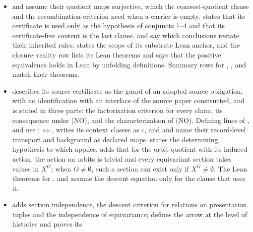 \begin{itemize}
  hypotheses of  are
  spelled out before them, the direct one through a declared reduct map, and a
  finite model with a closure operator follows each and satisfies its
  hypothesis. Both theorems state the finite model as their last clause, so
  neither implication follows from the axioms of a closure operator with
  reduct stability, and  adds that the converse
  fails exactly when some fixed point of the closure is not bare-realised.
\item {} and  assume their quotient maps surjective,
  which the coarsest-quotient clause and the recombination criterion need
  when a carrier is empty.  states that its certificate is
  used only as the hypothesis of conjuncts 1--4 and that its
  certificate-free content is the last clause.  and
   say which conclusions restate their inherited rules.
   states the scope of its substrate Lean anchor, and the
  closure--reality row lists its Lean theorems and says that the positive
  equivalence holds in Lean by unfolding definitions. Summary rows for
  , ,  and  match their theorems.
\item {} describes its source certificate as the guard of an
  adopted source obligation, with no identification with an interface of the
  source paper constructed, and  is stated
  in three parts: the factorization criterion for every claim, its
  consequence under (NO), and the characterization of (NO). Defining lines of
  ,  and  use
  \(:\Longleftrightarrow\),  writes its context classes as \(c\),
  and  and  name their record-level transport and
  background as declared maps.  states the determining hypothesis to which
   applies. 
  adds that for the orbit quotient with its induced action, the action on
  orbits is trivial and every equivariant section takes values in \(X^G\);
  when \(O\ne\emptyset\), such a section can exist only if
  \(X^G\ne\emptyset\). The Lean theorems for ,  and
   assume the descent equation only for the clause that uses it.
\item {} adds section independence, the descent criterion for
  relations on presentation tuples and the independence of equivariance;
   defines the arrow at the level of histories and proves its

\end{itemize}
